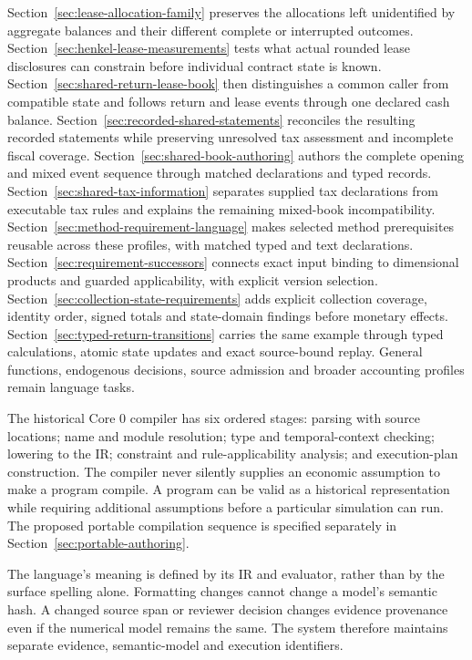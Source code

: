 Section~\ref{sec:lease-allocation-family} preserves the allocations left
unidentified by aggregate balances and their different complete or interrupted outcomes.
Section~\ref{sec:henkel-lease-measurements} tests what actual rounded lease
disclosures can constrain before individual contract state is known.
Section~\ref{sec:shared-return-lease-book} then distinguishes a common caller
from compatible state and follows return and lease events through one declared cash balance.
Section~\ref{sec:recorded-shared-statements} reconciles the resulting recorded statements
while preserving unresolved tax assessment and incomplete fiscal coverage.
Section~\ref{sec:shared-book-authoring} authors the complete opening and mixed
event sequence through matched declarations and typed records.
Section~\ref{sec:shared-tax-information} separates supplied tax declarations
from executable tax rules and explains the remaining mixed-book incompatibility.
Section~\ref{sec:method-requirement-language} makes selected method prerequisites
reusable across these profiles, with matched typed and text declarations.
Section~\ref{sec:requirement-successors} connects exact input binding to
dimensional products and guarded applicability, with explicit version selection.
Section~\ref{sec:collection-state-requirements} adds explicit collection coverage,
identity order, signed totals and state-domain findings before monetary effects.
Section~\ref{sec:typed-return-transitions} carries the same example through
typed calculations, atomic state updates and exact source-bound replay.
General functions,
endogenous decisions, source admission and broader accounting profiles remain
language tasks.

The historical Core 0 compiler has six ordered stages: parsing with source locations; name and
module resolution; type and temporal-context checking; lowering to the IR;
constraint and rule-applicability analysis; and execution-plan construction.
The compiler never silently supplies an economic assumption to make a program
compile. A program can be valid as a historical representation while requiring
additional assumptions before a particular simulation can run.
The proposed portable compilation sequence is specified separately in
Section~\ref{sec:portable-authoring}.

The language's meaning is defined by its IR and evaluator, rather than by the
surface spelling alone. Formatting changes cannot change a model's semantic
hash. A changed source span or reviewer decision changes evidence provenance
even if the numerical model remains the same. The system therefore maintains
separate evidence, semantic-model and execution identifiers.

